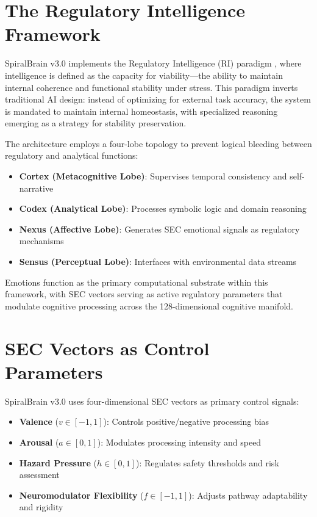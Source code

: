 \documentclass[12pt,a4paper]{report}
\begin{document}
\section{The Regulatory Intelligence Framework}

SpiralBrain v3.0 implements the Regulatory Intelligence (RI) paradigm \cite{Cragin2026Thesis}, where intelligence is defined as the capacity for viability—the ability to maintain internal coherence and functional stability under stress. This paradigm inverts traditional AI design: instead of optimizing for external task accuracy, the system is mandated to maintain internal homeostasis, with specialized reasoning emerging as a strategy for stability preservation.

The architecture employs a four-lobe topology to prevent logical bleeding between regulatory and analytical functions:

\begin{itemize}
\item \textbf{Cortex (Metacognitive Lobe)}: Supervises temporal consistency and self-narrative
\item \textbf{Codex (Analytical Lobe)}: Processes symbolic logic and domain reasoning  
\item \textbf{Nexus (Affective Lobe)}: Generates SEC emotional signals as regulatory mechanisms
\item \textbf{Sensus (Perceptual Lobe)}: Interfaces with environmental data streams
\end{itemize}

Emotions function as the primary computational substrate within this framework, with SEC vectors serving as active regulatory parameters that modulate cognitive processing across the 128-dimensional cognitive manifold.

\section{SEC Vectors as Control Parameters}

SpiralBrain v3.0 uses four-dimensional SEC vectors as primary control signals:

\begin{itemize}
\item \textbf{Valence} ($v \in [-1,1]$): Controls positive/negative processing bias
\item \textbf{Arousal} ($a \in [0,1]$): Modulates processing intensity and speed
\item \textbf{Hazard Pressure} ($h \in [0,1]$): Regulates safety thresholds and risk assessment
\item \textbf{Neuromodulator Flexibility} ($f \in [-1,1]$): Adjusts pathway adaptability and rigidity
\end{itemize}
\end{document}
